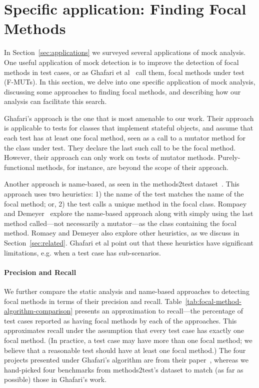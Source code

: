 \section{Specific application: Finding Focal Methods}
\label{sec:focal}

In Section~\ref{sec:applications} we surveyed several applications of mock analysis.
One useful application of mock detection is to
improve the detection of focal methods in test cases, or as Ghafari et
al~\cite{ghafari15:_autom} call them, focal methods under test
(F-MUTs). In this section, we delve into one specific application of mock analysis, 
discussing some approaches to finding
focal methods, and describing how our analysis can facilitate this search.

Ghafari's approach is the one that is most amenable to our work.
Their approach is applicable to tests for classes that implement
stateful objects, and assume that each test has at least one focal
method, seen as a call to a mutator method for the class under test.
They declare the last such call to be the focal method. However, their approach can
only work on tests of mutator methods.  Purely-functional methods, for
instance, are beyond the scope of their approach.

Another approach is name-based, as seen in the methods2test
dataset~\cite{tufano2020unit}.  This approach uses two heuristics: 1)
the name of the test matches the name of the focal method; or, 2) the
test calls a unique method in the focal class. Rompaey and
Demeyer~\cite{rompaey09:_estab_traceab_links_unit_test} explore the
name-based approach along with simply using the last method called---not necessarily a mutator---as the class containing the focal method.  Romaey and Demeyer also
explore other heuristics, as we discuss in Section~\ref{sec:related}. Ghafari et al point out
that these heuristics have significant limitations, e.g. when a
test case has sub-scenarios.

\paragraph{Precision and Recall}
We further compare the static analysis and name-based approaches to detecting focal methods in terms of their precision and recall. Table~\ref{tab:focal-method-algorithm-comparison} presents an approximation to recall---the percentage of test cases reported as having focal methods by each of the approaches. This approximates recall under the assumption that every test case has exactly one focal method. (In practice, a test case may have more than one focal method; we believe that a reasonable test should have at least one focal method.) The four projects presented under Ghafari's algorithm are from their paper~\cite{ghafari15:_autom}, whereas we hand-picked four benchmarks from methods2test's dataset to match (as far as possible) those in Ghafari's work.

